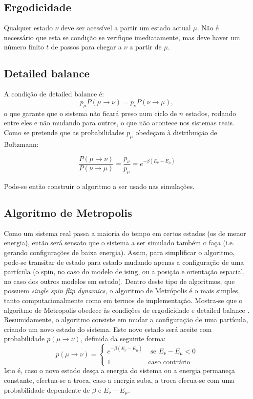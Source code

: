 \documentclass[a4paper,10pt]{article}
\begin{document}
\begin{multicols}{2}
\subsection{Ergodicidade}
Qualquer estado $\nu$ deve ser acessível a partir um estado actual $\mu$. Não é necessário que esta se condição se verifique imediatamente, mas deve haver um número finito $t$ de passos para chegar a $\nu$ a partir de $\mu$.

\subsection{Detailed balance}
A condição de detailed balance é:
\begin{equation}
p_{\mu}P(\mu\rightarrow\nu)=p_{\nu}P(\nu\rightarrow\mu) ,
\end{equation}
o que garante que o sistema não ficará preso num ciclo de $n$ estados, rodando entre eles e não mudando para outros, o que não acontece nos sistemas reais. Como se pretende que as probabilidades $p_{\mu}$ obedeçam à distribuição de Boltzmann:

\begin{equation}
      \frac{P(\mu\rightarrow\nu)}{P(\nu\rightarrow\mu)}=\frac{p_{\nu}}{p_{\mu}}=e^{-\beta (E_{\nu}-E_{\mu})}
\end{equation}

Pode-se então construir o algoritmo a ser usado nas simulações.

\subsection{Algoritmo de Metropolis}
Como um sistema real passa a maioria do tempo em certos estados (os de menor energia), então será sensato que o sistema a ser simulado também o faça (i.e. gerando configurações de baixa energia). Assim, para simplificar o algoritmo, pode-se transitar de estado para estado mudando apenas a configuração de uma partícula (o spin, no caso do modelo de ising, ou a posição e orientação espacial, no caso dos outros modelos em estudo). Dentro deste tipo de algoritmos, que possuem \textit{single spin flip dynamics}, o algoritmo de Metrópolis é o mais simples, tanto computacionalmente como em termos de implementação. Mostra-se que o algoritmo de Metropolis obedece às condições de ergodicidade e detailed balance \cite{barkema}. Resumidamente, o algoritmo consiste em mudar a configuração de uma partícula, criando um novo estado do sistema. Este novo estado será aceite com probabilidade $p(\mu\rightarrow\nu)$, definida da seguinte forma:
\small
\begin{equation}
	p(\mu\rightarrow\nu)=\left\{ \begin{array}{ll}
				e^{-\beta (E_{\nu}-E_{\mu})} & \mbox{ se $E_{\nu}-E_{\mu} < 0$} \\
				1 &\mbox{caso contrário}
				\end{array}\right.
\end{equation}
\normalsize
Isto é, caso o novo estado desça a energia do sistema ou a energia permaneça constante, efectua-se a troca, caso a energia suba, a troca efecua-se com uma probabilidade dependente de $\beta$ e $E_{\nu}-E_{\mu}$.


\end{multicols}
\end{document}
